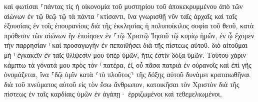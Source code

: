 \documentclass{openreader}
\begin{document}
καὶ φωτίσαι ⸀πάντας τίς ἡ οἰκονομία τοῦ μυστηρίου τοῦ ἀποκεκρυμμένου ἀπὸ τῶν αἰώνων ἐν τῷ θεῷ τῷ τὰ πάντα ⸀κτίσαντι, 
ἵνα γνωρισθῇ νῦν ταῖς ἀρχαῖς καὶ ταῖς ἐξουσίαις ἐν τοῖς ἐπουρανίοις διὰ τῆς ἐκκλησίας ἡ πολυποίκιλος σοφία τοῦ θεοῦ, 
κατὰ πρόθεσιν τῶν αἰώνων ἣν ἐποίησεν ἐν ⸀τῷ Χριστῷ Ἰησοῦ τῷ κυρίῳ ἡμῶν, 
ἐν ᾧ ἔχομεν τὴν παρρησίαν ⸀καὶ προσαγωγὴν ἐν πεποιθήσει διὰ τῆς πίστεως αὐτοῦ. 
διὸ αἰτοῦμαι μὴ ⸀ἐγκακεῖν ἐν ταῖς θλίψεσίν μου ὑπὲρ ὑμῶν, ἥτις ἐστὶν δόξα ὑμῶν. 
Τούτου χάριν κάμπτω τὰ γόνατά μου πρὸς τὸν ⸀πατέρα, 
ἐξ οὗ πᾶσα πατριὰ ἐν οὐρανοῖς καὶ ἐπὶ γῆς ὀνομάζεται, 
ἵνα ⸀δῷ ὑμῖν κατὰ ⸂τὸ πλοῦτος⸃ τῆς δόξης αὐτοῦ δυνάμει κραταιωθῆναι διὰ τοῦ πνεύματος αὐτοῦ εἰς τὸν ἔσω ἄνθρωπον, 
κατοικῆσαι τὸν Χριστὸν διὰ τῆς πίστεως ἐν ταῖς καρδίαις ὑμῶν ἐν ἀγάπῃ· ἐρριζωμένοι καὶ τεθεμελιωμένοι, 
\end{document}
